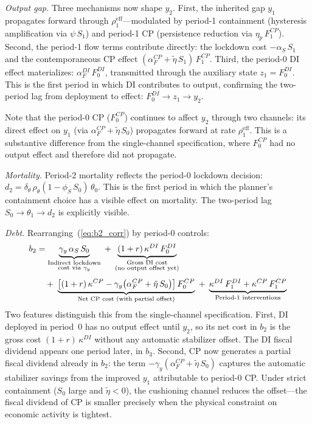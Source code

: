 \documentclass[12pt, a4paper]{article}
\begin{document}
\textit{Output gap.} Three mechanisms now shape $y_2$. First, the inherited gap
$y_1$ propagates forward through $\rho_1^{\mathrm{eff}}$---modulated by
period-1 containment (hysteresis amplification via $\psi\, S_1$) and period-1
CP (persistence reduction via $\eta_p\, F_1^{CP}$). Second, the period-1 flow
terms contribute directly: the lockdown cost $-\alpha_S\, S_1$ and the
contemporaneous CP effect
$(\alpha_F^{CP} + \tilde{\eta}\, S_1)\, F_1^{CP}$.
Third, the period-0 DI effect materializes:
$\alpha_F^{DI}\, F_0^{DI}$, transmitted through the auxiliary state
$z_1 = F_0^{DI}$. This is the first period in which DI contributes to output,
confirming the two-period lag from deployment to effect:
$F_0^{DI} \to z_1 \to y_2$.

Note that the period-0 CP ($F_0^{CP}$) continues to affect $y_2$ through two
channels: its direct effect on $y_1$ (via
$\alpha_F^{CP} + \tilde{\eta}\, S_0$) propagates forward at rate
$\rho_1^{\mathrm{eff}}$. This is a substantive difference from the
single-channel specification, where $F_0^{CP}$ had no output effect and
therefore did not propagate.

\textit{Mortality.} Period-2 mortality reflects the period-0 lockdown
decision: $d_2 = \delta_\theta\, \rho_\theta(1 - \phi_S\, S_0)\, \theta_0$.
This is the first period in which the planner's containment choice has a
visible effect on mortality. The two-period lag
$S_0 \to \theta_1 \to d_2$ is explicitly visible.

\textit{Debt.} Rearranging~(\ref{eq:b2_corr}) by period-0 controls:
%
\begin{align}
    b_2 &= \underbrace{\gamma_y\, \alpha_S\, S_0}_{\substack{
      \text{Indirect lockdown} \\ \text{cost via } \gamma_y}}
    \;+\; \underbrace{(1+r)\, \kappa^{DI}\, F_0^{DI}}_{\substack{
      \text{Gross DI cost} \\ \text{(no output offset yet)}}}
    \notag \\[4pt]
    &\quad+\; \underbrace{\left[(1+r)\, \kappa^{CP}
    - \gamma_y\bigl(\alpha_F^{CP} + \tilde{\eta}\, S_0\bigr)\right]
    F_0^{CP}}_{\text{Net CP cost (with partial offset)}}
    \;+\; \underbrace{\kappa^{DI}\, F_1^{DI}
    + \kappa^{CP}\, F_1^{CP}}_{\text{Period-1 interventions}}
    \label{eq:b2_grouped_corr}
\end{align}
%
Two features distinguish this from the single-channel specification. First,
DI deployed in period~0 has no output effect until $y_2$, so its net cost in
$b_2$ is the gross cost $(1+r)\, \kappa^{DI}$ without any automatic stabilizer
offset. The DI fiscal dividend appears one period later, in $b_3$.
Second, CP now generates a partial fiscal dividend already in $b_2$:
the term $-\gamma_y(\alpha_F^{CP} + \tilde{\eta}\, S_0)$ captures the
automatic stabilizer savings from the improved $y_1$ attributable to
period-0 CP. Under strict containment ($S_0$ large and
$\tilde{\eta} < 0$), the cushioning channel reduces the offset---the fiscal
dividend of CP is smaller precisely when the physical constraint on economic
activity is tightest.
\end{document}

